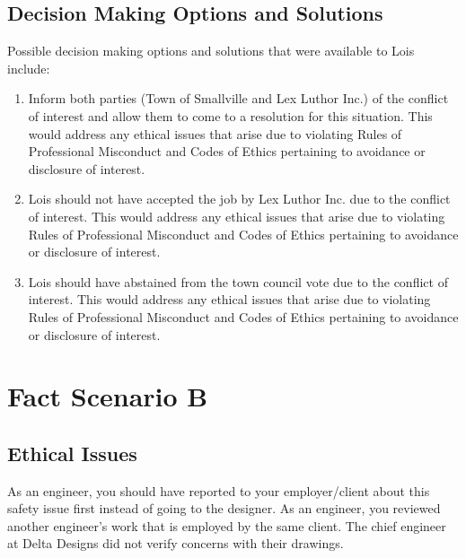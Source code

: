 \documentclass[12pt,letterpaper]{article}
\begin{document}
\subsection*{Decision Making Options and Solutions}
Possible decision making options and solutions that were available to Lois include:
\begin{enumerate}
	\item Inform both parties (Town of Smallville and Lex Luthor Inc.) of the conflict of interest and allow them to come to a resolution for this situation. This would address any ethical issues that arise due to violating Rules of Professional Misconduct and Codes of Ethics pertaining to avoidance or disclosure of interest.
	\item Lois should not have accepted the job by Lex Luthor Inc. due to the conflict of interest. This would address any ethical issues that arise due to violating Rules of Professional Misconduct and Codes of Ethics pertaining to avoidance or disclosure of interest.
	\item Lois should have abstained from the town council vote due to the conflict of interest. This would address any ethical issues that arise due to violating Rules of Professional Misconduct and Codes of Ethics pertaining to avoidance or disclosure of interest.
\end{enumerate}

\section*{Fact Scenario B}
\subsection*{Ethical Issues}
As an engineer, you should have reported to your employer/client about this safety issue first instead of going to the designer. As an engineer, you reviewed another engineer's work that is employed by the same client. The chief engineer at Delta Designs did not verify concerns with their drawings.
\end{document}
